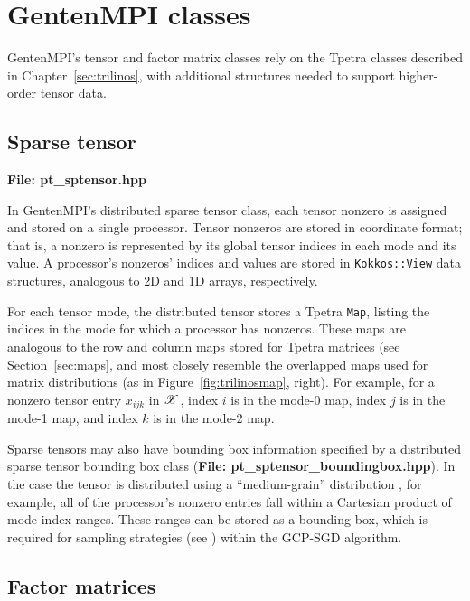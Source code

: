 
\chapter{GentenMPI classes} \label{sec:classes}

GentenMPI's tensor and factor matrix classes rely on the Tpetra classes 
described in Chapter~\ref{sec:trilinos}, with additional structures 
needed to support higher-order tensor data.

\section{Sparse tensor} \label{sec:sptensor}

{\bf File:  pt\_sptensor.hpp}

In GentenMPI's distributed sparse tensor class, each tensor nonzero is assigned
and stored on a single processor.  Tensor nonzeros are stored in coordinate
format; that is, a nonzero is represented by its global tensor indices
in each mode and its value.  A processor's nonzeros' indices and values are
stored in {\tt Kokkos::View} data structures, analogous to 2D and 1D arrays,
respectively.

For each tensor mode, the distributed tensor stores a Tpetra {\tt Map},
listing the indices in the mode for which a processor has nonzeros.  These
maps are analogous to the row and column maps stored for Tpetra matrices
(see Section~\ref{sec:maps}, and most closely resemble the overlapped
maps used for matrix
distributions (as in Figure~\ref{fig:trilinosmap}, right).  
For example, for a nonzero tensor entry $x_{ijk}$ in $\X$, 
index $i$ is in the mode-0 map, index $j$ is in the mode-1 map, and index
$k$ is in the mode-2 map.

Sparse tensors may also have bounding box information specified by a distributed sparse tensor bounding box class ({\bf File: pt\_sptensor\_boundingbox.hpp}).
In the case the tensor is distributed using a ``medium-grain'' distribution \cite{SK16}, for example, all of the processor's nonzero entries fall within a Cartesian product of mode index ranges.
These ranges can be stored as a bounding box, which is required for sampling strategies (see ) within the GCP-SGD algorithm.

\section{Factor matrices} \label{sec:factormatrix}

